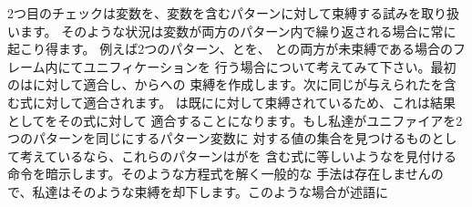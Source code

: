2つ目のチェックは変数を、変数を含むパターンに対して束縛する試みを取り扱います。
そのような状況は変数が両方のパターン内で繰り返される場合に常に起こり得ます。
例えば2つのパターン、とを、
との両方が未束縛である場合のフレーム内にてユニフィケーションを
行う場合について考えてみて下さい。最初のはに対して適合し、からへの
束縛を作成します。次に同じが与えられたを含む式に対して適合されます。
は既にに対して束縛されているため、これは結果としてをその式に対して
適合することになります。もし私達がユニファイアを2つのパターンを同じにするパターン変数に
対する値の集合を見つけるものとして考えているなら、これらのパターンはがを
含む式に等しいようなを見付ける命令を暗示します。そのような方程式を解く一般的な
手法は存在しませんので、私達はそのような束縛を却下します。このような場合が述語に
